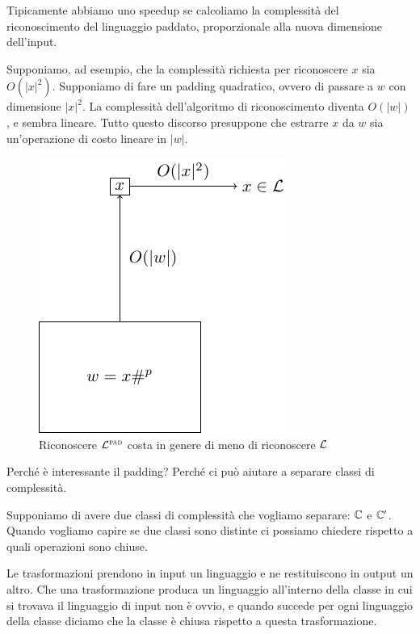 Tipicamente abbiamo uno speedup se calcoliamo la complessità del riconoscimento del linguaggio
paddato, proporzionale alla nuova dimensione dell'input.

Supponiamo, ad esempio, che la complessità richiesta per riconoscere $x$ sia $O(|x|^{2})$.
Supponiamo di fare un padding quadratico, ovvero di passare a $w$ con dimensione $|x|^{2}$. La
complessità dell'algoritmo di riconoscimento diventa $O(|w|)$, e sembra lineare. Tutto questo
discorso presuppone che estrarre $x$ da $w$ sia un'operazione di costo lineare in $|w|$.

\begin{figure}[h]
    \begin{center}
        \includegraphics{./img/timespacehierarchies/PaddingSpeedup.pdf}    
        \caption{Riconoscere $\mathcal{L}^{\textsc{pad}}$ costa in genere di meno di riconoscere $\mathcal{L}$}
    \end{center}
\end{figure}

Perché è interessante il padding? Perché ci può aiutare a separare classi di complessità. 

Supponiamo di avere due classi di complessità che vogliamo separare: $\mathbb{C}$ e $\mathbb{C}'$. Quando
vogliamo capire se due classi sono distinte ci possiamo chiedere rispetto a quali operazioni sono
chiuse.

Le trasformazioni prendono in input un linguaggio e ne restituiscono in output un altro. Che una
trasformazione produca un linguaggio all'interno della classe in cui si trovava il linguaggio di
input non è ovvio, e quando succede per ogni linguaggio della classe diciamo che la classe è
chiusa rispetto a questa trasformazione.

